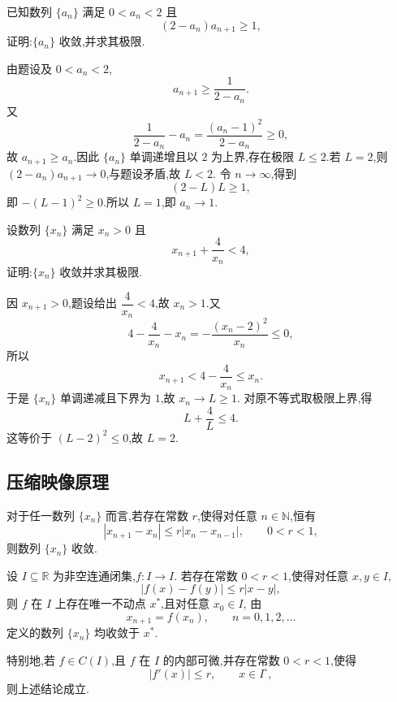 \begin{example}
  已知数列 $\{a_n\}$ 满足 $0<a_n<2$ 且
  \[
    (2-a_n)a_{n+1}\geq1,
  \]
  证明:$\{a_n\}$ 收敛,并求其极限.
\end{example}
\exampleblank

\begin{solution}
  由题设及 $0<a_n<2$,
  \[
    a_{n+1}\geq\dfrac{1}{2-a_n}.
  \]
  又
  \[
    \dfrac{1}{2-a_n}-a_n
    =\dfrac{(a_n-1)^2}{2-a_n}\geq0,
  \]
  故 $a_{n+1}\geq a_n$.因此 $\{a_n\}$ 单调递增且以 $2$ 为上界,存在极限
  $L\leq2$.若 $L=2$,则 $(2-a_n)a_{n+1}\to0$,与题设矛盾,故 $L<2$.
  令 $n\to\infty$,得到
  \[
    (2-L)L\geq1,
  \]
  即 $-(L-1)^2\geq0$.所以 $L=1$,即 $a_n\to1$.
\end{solution}

\begin{example}
  设数列 $\{x_n\}$ 满足 $x_n>0$ 且
  \[
    x_{n+1}+\dfrac{4}{x_n}<4,
  \]
  证明:$\{x_n\}$ 收敛并求其极限.
\end{example}
\exampleblank

\begin{solution}
  因 $x_{n+1}>0$,题设给出 $\dfrac{4}{x_n}<4$,故 $x_n>1$.又
  \[
    4-\dfrac{4}{x_n}-x_n
    =-\dfrac{(x_n-2)^2}{x_n}\leq0,
  \]
  所以
  \[
    x_{n+1}<4-\dfrac{4}{x_n}\leq x_n.
  \]
  于是 $\{x_n\}$ 单调递减且下界为 $1$,故 $x_n\to L\geq1$.
  对原不等式取极限上界,得
  \[
    L+\dfrac{4}{L}\leq4.
  \]
  这等价于 $(L-2)^2\leq0$,故 $L=2$.
\end{solution}



\subsection{压缩映像原理}

\begin{theorem}[\markstar]
  对于任一数列 $\{x_n\}$ 而言,若存在常数 $r$,使得对任意 $n\in\mathbb{N}$,恒有
  \[
    |x_{n+1}-x_n|\leq r|x_n-x_{n-1}|,
    \qquad 0<r<1,
  \]
  则数列 $\{x_n\}$ 收敛.
\end{theorem}

\begin{corollary}
    设 $I\subseteq\mathbb{R}$ 为非空连通闭集,$f:I\to I$.
    若存在常数 $0<r<1$,使得对任意 $x,y\in I$,
    \[
        |f(x)-f(y)|\leq r|x-y|,
    \]
    则 $f$ 在 $I$ 上存在唯一不动点 $x^*$,且对任意 $x_0\in I$,
    由
    \[
        x_{n+1}=f(x_n),\qquad n=0,1,2,\ldots
    \]
    定义的数列 $\{x_n\}$ 均收敛于 $x^*$.

    特别地,若 $f\in C(I)$,且 $f$ 在 $I$ 的内部可微,并存在常数
    $0<r<1$,使得
    \[
        |f'(x)|\leq r,\qquad x\in I^\circ,
    \]
    则上述结论成立.
\end{corollary}

